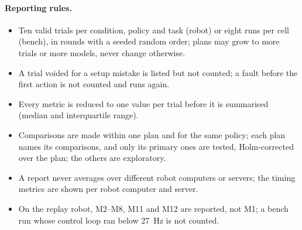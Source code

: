 \paragraph{Reporting rules.}
\begin{itemize}
\item Ten valid trials per condition, policy and task (robot) or eight runs per cell (bench), in rounds with a seeded
      random order; plans may grow to more trials or more models, never change otherwise.
\item A trial voided for a setup mistake is listed but not counted; a fault before the first action is not counted
      and runs again.
\item Every metric is reduced to one value per trial before it is summarised (median and interquartile range).
\item Comparisons are made within one plan and for the same policy; each plan names its comparisons, and only its
      primary ones are tested, Holm-corrected over the plan; the others are exploratory.
\item A report never averages over different robot computers or servers; the timing metrics are shown per robot
      computer and server.
\item On the replay robot, M2--M8, M11 and M12 are reported, not M1; a bench run whose control loop ran below 27~Hz is
      not counted.
\end{itemize}
